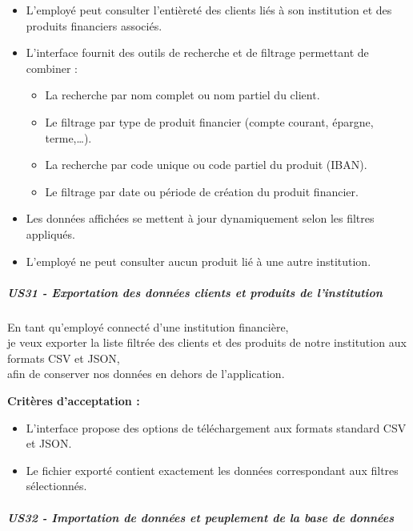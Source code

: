 \begin{itemize}
\tightlist
\item
  L'employé peut consulter l'entièreté des clients liés à son
  institution et des produits financiers associés.
\item
  L'interface fournit des outils de recherche et de filtrage permettant
  de combiner :

  \begin{itemize}
  \tightlist
  \item
    La recherche par nom complet ou nom partiel du client.
  \item
    Le filtrage par type de produit financier (compte courant, épargne,
    terme,\ldots).
  \item
    La recherche par code unique ou code partiel du produit (IBAN).
  \item
    Le filtrage par date ou période de création du produit financier.
  \end{itemize}
\item
  Les données affichées se mettent à jour dynamiquement selon les
  filtres appliqués.
\item
  L'employé ne peut consulter aucun produit lié à une autre institution.
\end{itemize}

\hypertarget{us31---exportation-des-donnuxe9es-clients-et-produits-de-linstitution}{%
\subparagraph{US31 - Exportation des données clients et produits de
l'institution}\label{us31---exportation-des-donnuxe9es-clients-et-produits-de-linstitution}}

En tant qu'employé connecté d'une institution financière,\\
je veux exporter la liste filtrée des clients et des produits de notre
institution aux formats CSV et JSON,\\
afin de conserver nos données en dehors de l'application.

\textbf{Critères d'acceptation :}

\begin{itemize}
\tightlist
\item
  L'interface propose des options de téléchargement aux formats standard
  CSV et JSON.
\item
  Le fichier exporté contient exactement les données correspondant aux
  filtres sélectionnés.
\end{itemize}

\hypertarget{us32---importation-de-donnuxe9es-et-peuplement-de-la-base-de-donnuxe9es}{%
\subparagraph{US32 - Importation de données et peuplement de la base de
données}\label{us32---importation-de-donnuxe9es-et-peuplement-de-la-base-de-donnuxe9es}}

